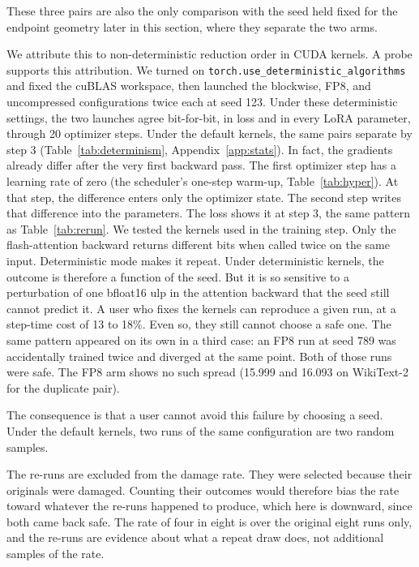 \documentclass[11pt,letterpaper]{article}
\begin{document}
These three pairs are also the only comparison with the seed held fixed for the endpoint geometry later in this section, where they separate the two arms.

We attribute this to non-deterministic reduction order in CUDA kernels. A probe supports this attribution. We turned on \texttt{torch.use\_deterministic\_algorithms} and fixed the cuBLAS workspace, then launched the blockwise, FP8, and uncompressed configurations twice each at seed 123. Under these deterministic settings, the two launches agree bit-for-bit, in loss and in every LoRA parameter, through 20 optimizer steps. Under the default kernels, the same pairs separate by step 3 (Table~\ref{tab:determinism}, Appendix~\ref{app:stats}). In fact, the gradients already differ after the very first backward pass. The first optimizer step has a learning rate of zero (the scheduler's one-step warm-up, Table~\ref{tab:hyper}). At that step, the difference enters only the optimizer state. The second step writes that difference into the parameters. The loss shows it at step 3, the same pattern as Table~\ref{tab:rerun}. We tested the kernels used in the training step. Only the flash-attention backward returns different bits when called twice on the same input. Deterministic mode makes it repeat. Under deterministic kernels, the outcome is therefore a function of the seed. But it is so sensitive to a perturbation of one bfloat16 ulp in the attention backward that the seed still cannot predict it. A user who fixes the kernels can reproduce a given run, at a step-time cost of 13 to 18\%. Even so, they still cannot choose a safe one. The same pattern appeared on its own in a third case: an FP8 run at seed 789 was accidentally trained twice and diverged at the same point. Both of those runs were safe. The FP8 arm shows no such spread (15.999 and 16.093 on WikiText-2 for the duplicate pair).

The consequence is that a user cannot avoid this failure by choosing a seed. Under the default kernels, two runs of the same configuration are two random samples.

The re-runs are excluded from the damage rate. They were selected because their originals were damaged. Counting their outcomes would therefore bias the rate toward whatever the re-runs happened to produce, which here is downward, since both came back safe. The rate of four in eight is over the original eight runs only, and the re-runs are evidence about what a repeat draw does, not additional samples of the rate.
\end{document}
